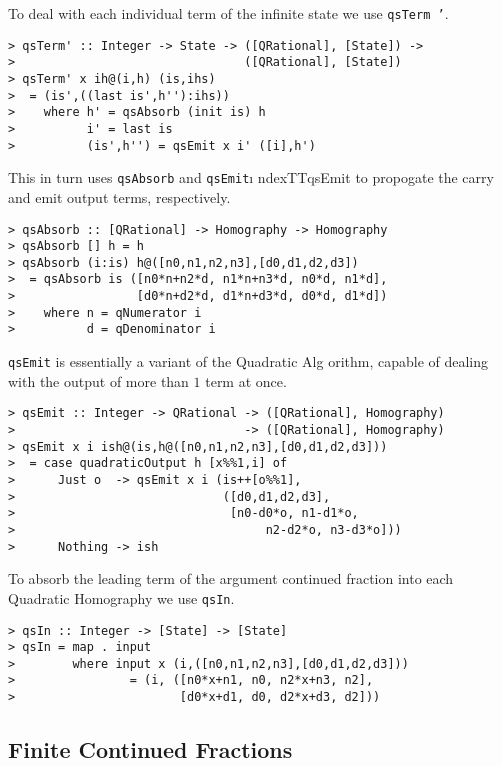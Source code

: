 %
%
To deal with each individual term of the infinite state we use \mbox{\tt qsTerm
'}.
\begin{verbatim}
> qsTerm' :: Integer -> State -> ([QRational], [State]) -> 
>                                ([QRational], [State])
> qsTerm' x ih@(i,h) (is,ihs)
>  = (is',((last is',h''):ihs))
>    where h' = qsAbsorb (init is) h
>          i' = last is
>          (is',h'') = qsEmit x i' ([i],h')
\end{verbatim}
This in turn uses \mbox{\tt qsAbsorb} and \mbox{\tt qsEmit}\i
ndexTT{qsEmit} to propogate the carry and
emit output terms, respectively.
\begin{verbatim}
> qsAbsorb :: [QRational] -> Homography -> Homography
> qsAbsorb [] h = h
> qsAbsorb (i:is) h@([n0,n1,n2,n3],[d0,d1,d2,d3])
>  = qsAbsorb is ([n0*n+n2*d, n1*n+n3*d, n0*d, n1*d],
>                 [d0*n+d2*d, d1*n+d3*d, d0*d, d1*d])
>    where n = qNumerator i
>          d = qDenominator i
\end{verbatim}
%
%
%
\mbox{\tt qsEmit} is essentially a variant of the Quadratic Alg
orithm, capable
of dealing with the output of more than $1$ term at once.
\begin{verbatim}
> qsEmit :: Integer -> QRational -> ([QRational], Homography)
>                                -> ([QRational], Homography)
> qsEmit x i ish@(is,h@([n0,n1,n2,n3],[d0,d1,d2,d3]))
>  = case quadraticOutput h [x%%1,i] of
>      Just o  -> qsEmit x i (is++[o%%1],
>                             ([d0,d1,d2,d3],
>                              [n0-d0*o, n1-d1*o,
>                                   n2-d2*o, n3-d3*o]))
>      Nothing -> ish
\end{verbatim}
%
%
To absorb the leading term of the argument continued fraction into
each Quadratic Homography we use \mbox{\tt qsIn}.
\begin{verbatim}
> qsIn :: Integer -> [State] -> [State]
> qsIn = map . input
>        where input x (i,([n0,n1,n2,n3],[d0,d1,d2,d3]))
>                = (i, ([n0*x+n1, n0, n2*x+n3, n2],
>                       [d0*x+d1, d0, d2*x+d3, d2]))
\end{verbatim}
%
%
\subsection{Finite Continued Fractions}

